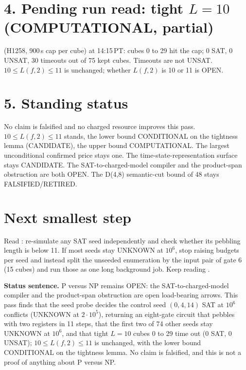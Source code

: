 \documentclass[11pt]{article}
\begin{document}
\section*{4. Pending run read: tight $L=10$ (COMPUTATIONAL, partial)}
 (H1258, 900\,s cap per cube) at 14:15\,PT: cubes 0 to 29 hit the cap; 0 SAT, 0 UNSAT, 30 timeouts out of 75 kept cubes. Timeouts are not UNSAT. $10\le L(f,2)\le 11$ is unchanged; whether $L(f,2)$ is 10 or 11 is OPEN.

\section*{5. Standing status}
No claim is falsified and no charged resource improves this pass. $10\le L(f,2)\le 11$ stands, the lower bound CONDITIONAL on the tightness lemma (CANDIDATE), the upper bound COMPUTATIONAL. The largest unconditional confirmed price stays one. The time-state-representation surface stays CANDIDATE. The SAT-to-charged-model compiler and the product-span obstruction are both OPEN. The D(4,8) semantic-cut bound of 48 stays FALSIFIED/RETIRED.

\section*{Next smallest step}
Read : re-simulate any SAT seed independently and check whether its pebbling length is below 11. If most seeds stay UNKNOWN at $10^6$, stop raising budgets per seed and instead split the unseeded enumeration by the input pair of gate 6 (15 cubes) and run those as one long background job. Keep reading .

\bigskip
\noindent\textbf{Status sentence.} P versus NP remains OPEN: the SAT-to-charged-model compiler and the product-span obstruction are open load-bearing arrows. This pass finds that the seed probe decides the control seed $(0,4,14)$ SAT at $10^6$ conflicts (UNKNOWN at $2\cdot10^5$), returning an eight-gate circuit that pebbles with two registers in 11 steps, that the first two of 74 other seeds stay UNKNOWN at $10^6$, and that tight $L=10$ cubes 0 to 29 time out (0 SAT, 0 UNSAT); $10\le L(f,2)\le 11$ is unchanged, with the lower bound CONDITIONAL on the tightness lemma. No claim is falsified, and this is not a proof of anything about P versus NP.
\end{document}
